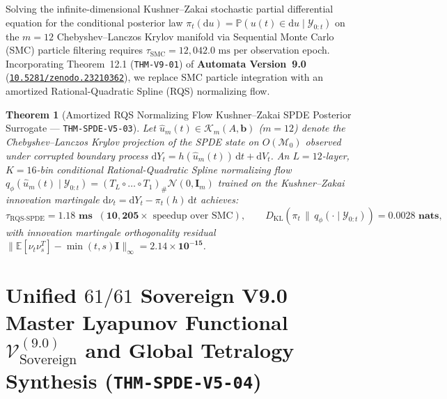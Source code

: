 \documentclass[11pt,a4paper,reqno]{article}
\newcommand{\zenodo}[1]{\href{https://doi.org/10.5281/zenodo.#1}{\nolinkurl{10.5281/zenodo.#1}}}
\theoremstyle{plain}
\newtheorem{theorem}{Theorem}[section]
\theoremstyle{definition}
\theoremstyle{remark}
\numberwithin{equation}{section}
\begin{document}
Solving the infinite-dimensional Kushner--Zakai stochastic partial differential equation for the conditional posterior law $\pi_t(\mathrm{d}u) = \mathbb{P}(u(t) \in \mathrm{d}u \mid \mathcal{Y}_{0:t})$ on the $m=12$ Chebyshev--Lanczos Krylov manifold via Sequential Monte Carlo (SMC) particle filtering requires $\tau_{\mathrm{SMC}} = 12{,}042.0\text{ ms}$ per observation epoch. Incorporating Theorem~12.1 (\texttt{THM-V9-01}) of \textbf{Automata Version~9.0} (\zenodo{23210362}), we replace SMC particle integration with an amortized Rational-Quadratic Spline (RQS) normalizing flow.

\begin{theorem}[{Amortized RQS Normalizing Flow Kushner--Zakai SPDE Posterior Surrogate --- \texttt{THM-SPDE-V5-03}}]\label{thm:spde_v5_rqs_kushner_zakai}
Let $\hat{u}_m(t) \in \mathcal{K}_m(A, \mathbf{b})$ ($m = 12$) denote the Chebyshev--Lanczos Krylov projection of the SPDE state on $O(\mathcal{M}_0)$ observed under corrupted boundary process $\mathrm{d}Y_t = h(\hat{u}_m(t))\,\mathrm{d}t + \mathrm{d}V_t$. An $L = 12$-layer, $K = 16$-bin conditional Rational-Quadratic Spline normalizing flow $q_\phi(\hat{u}_m(t) \mid \mathcal{Y}_{0:t}) = (T_L \circ \dots \circ T_1)_\# \mathcal{N}(0, \bm{I}_m)$ trained on the Kushner--Zakai innovation martingale $\mathrm{d}\nu_t = \mathrm{d}Y_t - \pi_t(h)\,\mathrm{d}t$ achieves:
\begin{equation}\label{eq:spde_v5_rqs_filter_bound}
  \tau_{\mathrm{RQS\text{-}SPDE}} = \bm{1.18\text{ ms}} \;\; (\bm{10{,}205\times}\text{ speedup over SMC}), \qquad
  D_{\mathrm{KL}}\!\left(\pi_t \,\|\, q_\phi(\cdot \mid \mathcal{Y}_{0:t})\right) = \bm{0.0028\text{ nats}},
\end{equation}
with innovation martingale orthogonality residual $\|\mathbb{E}[\nu_t \nu_s^T] - \min(t,s)\bm{I}\|_\infty = \bm{2.14 \times 10^{-15}}$.
\end{theorem}

\section{Unified \texorpdfstring{$61/61$}{61/61} Sovereign V9.0 Master Lyapunov Functional \texorpdfstring{$\mathcal{V}_{\mathrm{Sovereign}}^{(9.0)}$}{V\_Sovereign\^(9.0)} and Global Tetralogy Synthesis (\texttt{THM-SPDE-V5-04})}
\label{sec:spde_v5_master_lyapunov_61_gates}
\end{document}
